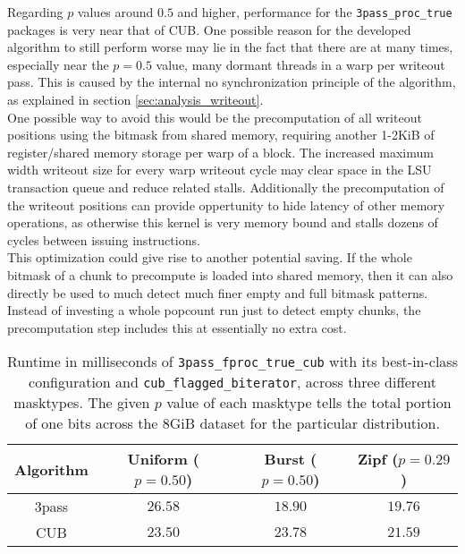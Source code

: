\documentclass{tudscrreprt}
\begin{document}
			Regarding $p$ values around $0.5$ and higher, performance for the \texttt{3pass\_proc\_true} packages is very near that of CUB. One possible reason for the developed algorithm to still perform worse may lie in the fact that there are at many times, especially near the $p=0.5$ value, many dormant threads in a warp per writeout pass. This is caused by the internal no synchronization principle of the algorithm, as explained in section \ref{sec:analysis_writeout}. \\
			One possible way to avoid this would be the precomputation of all writeout positions using the bitmask from shared memory, requiring another 1-2KiB of register/shared memory storage per warp of a block. The increased maximum width writeout size for every warp writeout cycle may clear space in the LSU transaction queue and reduce related stalls. Additionally the precomputation of the writeout positions can provide oppertunity to hide latency of other memory operations, as otherwise this kernel is very memory bound and stalls dozens of cycles between issuing instructions. \\
			This optimization could give rise to another potential saving. If the whole bitmask of a chunk to precompute is loaded into shared memory, then it can also directly be used to much detect much finer empty and full bitmask patterns. Instead of investing a whole popcount run just to detect empty chunks, the precomputation step includes this at essentially no extra cost. \\
			
			\begin{table}[!ht]
				\centering
				\begin{tabular}{c | c c c}
					\hline
					Algorithm & Uniform ($p=0.50$) & Burst ($p=0.50$) & Zipf ($p=0.29$) \\
					\hline
					3pass & $26.58$ & $18.90$ & $19.76$ \\
					CUB & $23.50$ & $23.78$ & $21.59$ \\
					\hline
				\end{tabular}
				\caption{\label{table:masktype_perf_comp}Runtime in milliseconds of \texttt{3pass\_fproc\_true\_cub} with its best-in-class configuration and \texttt{cub\_flagged\_biterator}, across three different masktypes. The given $p$ value of each masktype tells the total portion of one bits across the 8GiB dataset for the particular distribution.}
			\end{table}
			
\end{document}
